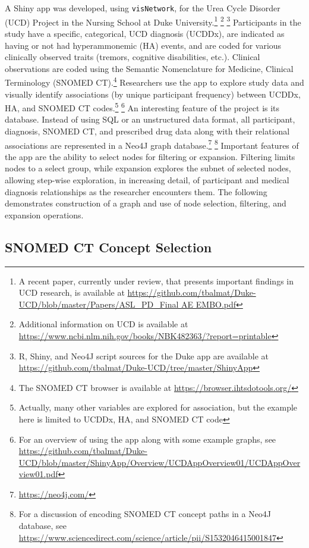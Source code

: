 \documentclass[10pt, letterpaper]{article}
\begin{document}
\begin{spacing}{1.0}
A Shiny app was developed, using \texttt{visNetwork}, for the Urea Cycle Disorder (UCD) Project in the Nursing School at Duke University.\footnote{A recent paper, currently under review, that presents important findings in UCD research, is available at \url{https://github.com/tbalmat/Duke-UCD/blob/master/Papers/ASL\_PD\_Final AE EMBO.pdf}}  \footnote{Additional information on UCD is available at \url{https://www.ncbi.nlm.nih.gov/books/NBK482363/?report=printable}} \footnote{R, Shiny, and Neo4J script sources for the Duke app are available at \url{https://github.com/tbalmat/Duke-UCD/tree/master/ShinyApp}}  Participants in the study have a specific, categorical, UCD diagnosis (UCDDx), are indicated as having or not had hyperammonemic (HA) events, and are coded for various clinically observed traits (tremors, cognitive disabilities, etc.).  Clinical observations are coded using the Semantic Nomenclature for Medicine, Clinical Terminology (SNOMED CT).\footnote{The SNOMED CT browser is available at \url{https://browser.ihtsdotools.org/}}  Researchers use the app to explore study data and visually identify associations (by unique participant frequency) between UCDDx, HA, and SNOMED CT codes.\footnote{Actually, many other variables are explored for association, but the example here is limited to UCDDx, HA, and SNOMED CT code} \footnote{For an overview of using the app along with some example graphs, see \url{https://github.com/tbalmat/Duke-UCD/blob/master/ShinyApp/Overview/UCDAppOverview01/UCDAppOverview01.pdf}}  An interesting feature of the project is its database.  Instead of using SQL or an unstructured data format, all participant, diagnosis, SNOMED CT, and prescribed drug data along with their relational associations are represented in a Neo4J graph database.\footnote{\url{https://neo4j.com/}} \footnote{For a discussion of encoding SNOMED CT concept paths in a Neo4J database, see \url{https://www.sciencedirect.com/science/article/pii/S1532046415001847}}  Important features of the app are the ability to select nodes for filtering or expansion.  Filtering limits nodes to a select group, while expansion explores the subnet of selected nodes, allowing step-wise exploration, in increasing detail, of participant and medical diagnosis relationships as the researcher encounters them.  The following demonstrates construction of a graph and use of node selection, filtering, and expansion operations.\\

\subsection{SNOMED CT Concept Selection}


\end{spacing}
\end{document}
